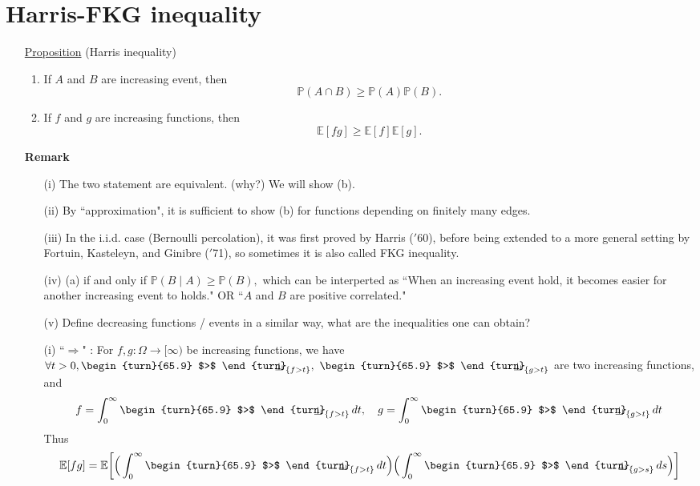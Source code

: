 \documentclass[12pt,a4paper]{report}
\theoremstyle{definition}
\newcommand{\SOL}{\fbox{ \tt s\parbox[b][2pt][c]{6pt}{o}\hspace*{-7pt} L:}}
\newcommand{\indecate}{\mbox{\begin{turn}{65.9}
$>$
\end{turn}\hspace{-10.5pt}\parbox[t][-5pt][c]{10pt}{$\bot$}\hspace{-4.35pt}\parbox[t][-3.4pt][c]{4pt}{$\shortmid$}}}
\begin{document}
\section{Harris-FKG inequality}
\begin{enumerate}
    \item[\underline{Proposition}] (Harris inequality) \begin{enumerate}
        \item If $A$ and $B$ are increasing event, then
        \[
        \mathbb{P}(A\cap B)\geq \mathbb{P}(A)\mathbb{P}(B).
        \]
        \item If $f$ and $g$ are increasing functions, then
        \[
        \mathbb{E}[fg]\geq \mathbb{E}[f]\mathbb{E}[g].
        \]
    \end{enumerate}
    \item[\textbf{Remark}] \begin{enumerate}
        \item[(i)] The two statement are equivalent. (why?) We will show (b).
        \item[(ii)] By ``approximation", it is sufficient to show (b) for functions depending on finitely many edges.
        \item[(iii)] In the i.i.d. case (Bernoulli percolation), it was first proved by Harris ($'$60), before being extended to a more general setting by Fortuin, Kasteleyn, and Ginibre ($'$71), so sometimes it is also called FKG inequality.
        \item[(iv)] (a) if and only if $\mathbb{P}(B\mid A)\geq \mathbb{P}(B),$ which can be interperted as ``When an increasing event hold, it becomes easier for another increasing event to holds." OR ``$A$ and $B$ are positive correlated."
        \item[(v)] Define decreasing functions / events in a similar way, what are the inequalities one can obtain?
    \end{enumerate}
    \item[\SOL] \begin{enumerate}
        \item[(i)] ``$\Rightarrow$" : For $f,g:\Omega\to[\infty)$ be increasing functions, we have $\forall t>0, \indecate_{\{f>t\}}, \ \indecate_{\{g>t\}}$ are two increasing functions, and
        \[
        f=\int_0^\infty \indecate_{\{f>t\}}\,dt ,\quad g=\int_0^\infty \indecate_{\{g>t\}}\,dt
        \]
        Thus
        \begin{align*}
            \mathbb{E}[fg]&=\mathbb{E}\bigg[\Big(\int_0^\infty \indecate_{\{f>t\}}\,dt\Big)\Big(\int_0^\infty \indecate_{\{g>s\}}\,ds\Big)\bigg]\\

\end{align*}
\end{enumerate}
\end{enumerate}
\end{document}
